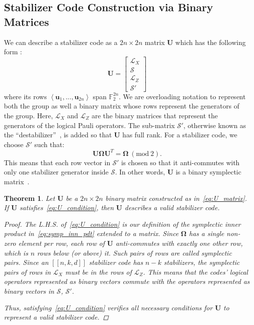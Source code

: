 \documentclass[conference]{IEEEtran}
\newtheorem{theorem}{Theorem}
\newcommand{\llbr}{[\![}
\newcommand{\rrbr}{]\!]}
\begin{document}
\subsection{Stabilizer Code Construction via Binary Matrices}
We can describe a stabilizer code as a $2n \times 2n$ matrix $\boldsymbol{U}$ which has the following form \cite{rengaswamy2018synthesis}:
\begin{equation} 
\label{eq:U_matrix}
\boldsymbol{U}=
\begin{bmatrix}
    \mathcal{L}_{X} \\
    \mathcal{S} \\
    \mathcal{L}_{Z} \\
    \mathcal{S}'
\end{bmatrix}
\end{equation}
where its rows $\left<\boldsymbol{u}_{1},...,\boldsymbol{u}_{2n}\right>$ span $\mathbb{F}^{2n}_{2}$. 
We are overloading notation to represent both the group as well a binary matrix whose rows represent the generators of the group.
Here, $\mathcal{L}_{X}$ and  $\mathcal{L}_{Z}$ are the binary matrices that represent the generators of the logical Pauli operators. 
The sub-matrix $\mathcal{S}'$, otherwise known as the ``destabilizer''~\cite{Aaronson-pra04}, is added so that $\boldsymbol{U}$ has full rank. For a stabilizer code, we choose $\mathcal{S}'$ such that:
\begin{equation}
\label{eq:U_condition}
\boldsymbol{U}\boldsymbol{\Omega}\boldsymbol{U}^T=\boldsymbol{\Omega} \ (\mathrm{mod} \ 2).
\end{equation}
This means that each row vector in $\mathcal{S}'$ is chosen so that it anti-commutes with only one stabilizer generator inside $\mathcal{S}$. 
In other words, $\boldsymbol{U}$ is a binary symplectic matrix~\cite{Dehaene-pra03}.

\begin{theorem} 
Let $\boldsymbol{U}$ be a $2n \times 2n$ binary matrix constructed as in~\eqref{eq:U_matrix}. 
If $\boldsymbol{U}$ satisfies~\eqref{eq:U_condition}, then $\boldsymbol{U}$ describes a valid stabilizer code.
\begin{proof}
The L.H.S. of~\eqref{eq:U_condition} is our definition of the symplectic inner product in~\eqref{eq:symp_inn_pdt} extended to a matrix. 
Since $\boldsymbol{\Omega}$ has a single non-zero element per row, each row of $\boldsymbol{U}$ anti-commutes with exactly one other row, which is $n$ rows below (or above) it. 
Such pairs of rows are called \textit{symplectic pairs}.
Since an $ \llbr n,k,d \rrbr$ stabilizer code 
has $n-k$ stabilizers, the symplectic pairs of rows in $\mathcal{L}_{X}$ must be in the rows of $\mathcal{L}_{Z}$. This means that the codes' logical operators represented as binary vectors commute with the operators represented as binary vectors in $\mathcal{S}$, $\mathcal{S}'$. 

Thus, satisfying~\eqref{eq:U_condition} verifies all necessary conditions for $\boldsymbol{U}$ to represent a valid stabilizer code.
\end{proof}
\end{theorem}
\end{document}
